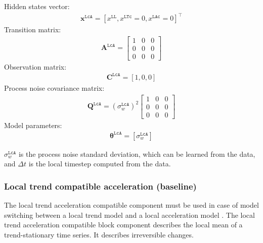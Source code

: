 Hidden states vector:
\begin{gather*}
 \mathbf{x}^{\mathtt{LcA}} = [x^{\mathtt{LL}}, x^{\mathtt{LTc}}=0, x^{\mathtt{LAc}}=0]^{\intercal}
 \end{gather*}
Transition matrix: 
\begin{gather*}
\mathbf{A}^{\mathtt{LcA}}= \left[\begin{array}{ccc}1&0&0\\0&0&0\\0&0&0\end{array}\right]
\end{gather*}
Observation matrix: 
\begin{gather*}
\mathbf{C}^{\mathtt{LcA}}=[1, 0, 0]
\end{gather*}
Process noise covariance matrix: 
\begin{gather*}
\mathbf{Q}^{\mathtt{LcA}}=(\sigma_{w}^{\mathtt{LcA}})^{2}\left[\begin{array}{ccc}1&0&0\\0&0&0\\0&0&0\end{array}\right]
\end{gather*}
Model parameters: 
\begin{gather*}
\bm\theta^{\mathtt{LcA}}=[\sigma_{w}^{\mathtt{LcA}} ]
\end{gather*}

\noindent
$\sigma_{w}^{\mathtt{LcA}}$ is the process noise standard deviation, which can be learned from the data, and $\Delta t$ is the local timestep computed from the data.

\subsubsection{Local trend compatible acceleration (baseline)}
The local trend acceleration compatible component must be used in case of model switching between a local trend model and a local acceleration model \cite{Nguyen2018}.
The local trend acceleration compatible block component describes the local mean of a trend-stationary time series. 
It describes irreversible changes.\\

